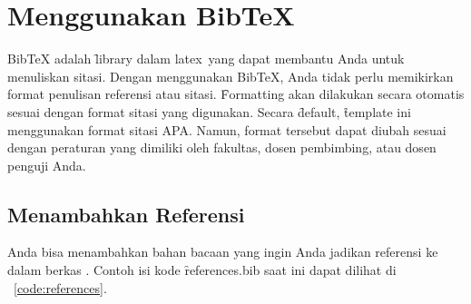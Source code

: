 \section{Menggunakan BibTeX}
\label{sec:bibtex}
BibTeX adalah \f{library} dalam \gls{latex}~yang dapat membantu Anda untuk menuliskan sitasi.
Dengan menggunakan BibTeX, Anda tidak perlu memikirkan format penulisan referensi atau sitasi.
\f{Formatting} akan dilakukan secara otomatis sesuai dengan format sitasi yang digunakan.
Secara \f{default}, \f{template} ini menggunakan format sitasi APA.
Namun, format tersebut dapat diubah sesuai dengan peraturan yang dimiliki oleh fakultas, dosen pembimbing, atau dosen penguji Anda.

\subsection{Menambahkan Referensi}
\label{sec:bibtexAddRef}
Anda bisa menambahkan bahan bacaan yang ingin Anda jadikan referensi ke dalam berkas .
Contoh isi kode \f{references.bib} saat ini dapat dilihat di \lst~\ref{code:references}.


